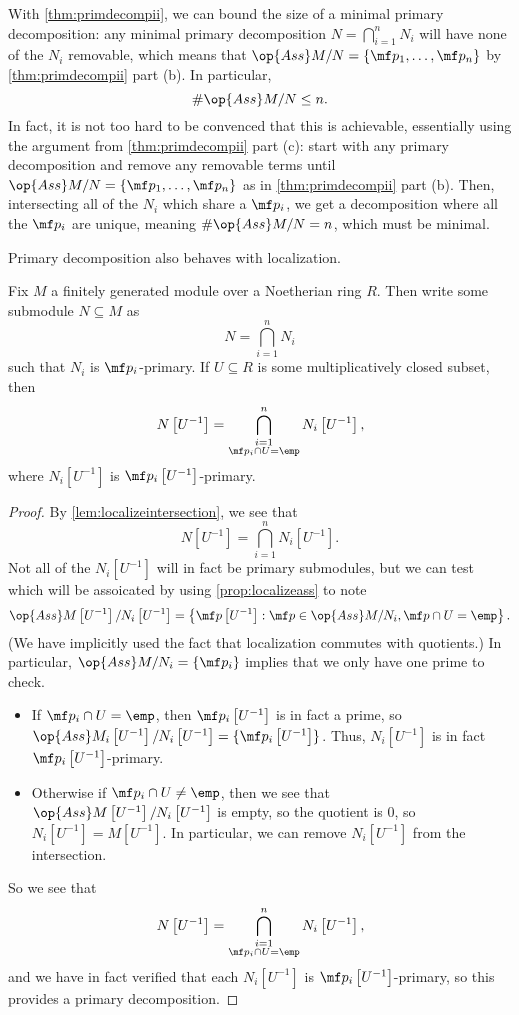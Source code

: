 \begin{remark}[Nir] \label{rem:findminimalprimdecomp}
	With \autoref{thm:primdecompii}, we can bound the size of a minimal primary decomposition: any minimal primary decomposition $N=\bigcap_{i=1}^nN_i$ will have none of the $N_i$ removable, which means that $\op{Ass}M/N=\{\mf p_1,\ldots,\mf p_n\}$ by \autoref{thm:primdecompii} part (b). In particular,
	\[\#\op{Ass}M/N\le n.\]
	In fact, it is not too hard to be convenced that this is achievable, essentially using the argument from \autoref{thm:primdecompii} part (c): start with any primary decomposition and remove any removable terms until $\op{Ass}M/N=\{\mf p_1,\ldots,\mf p_n\}$ as in \autoref{thm:primdecompii} part (b). Then, intersecting all of the $N_i$ which share a $\mf p_i$, we get a decomposition where all the $\mf p_i$ are unique, meaning $\#\op{Ass}M/N=n$, which must be minimal.
\end{remark}
Primary decomposition also behaves with localization.
\begin{theorem}
	Fix $M$ a finitely generated module over a Noetherian ring $R$. Then write some submodule $N\subseteq M$ as
	\[N=\bigcap_{i=1}^nN_i\]
	such that $N_i$ is $\mf p_i$-primary. If $U\subseteq R$ is some multiplicatively closed subset, then
	\[N\left[U^{-1}\right]=\bigcap_{\substack{i=1\\\mf p_i\cap U=\emp}}^nN_i\left[U^{-1}\right],\]
	where $N_i\left[U^{-1}\right]$ is $\mf p_i\left[U^{-1}\right]$-primary.
\end{theorem}
\begin{proof}
	By \autoref{lem:localizeintersection}, we see that
	\[N\left[U^{-1}\right]=\bigcap_{i=1}^nN_i\left[U^{-1}\right].\]
	Not all of the $N_i\left[U^{-1}\right]$ will in fact be primary submodules, but we can test which will be assoicated by using \autoref{prop:localizeass} to note
	\[\op{Ass}M\left[U^{-1}\right]/N_i\left[U^{-1}\right]=\left\{\mf p\left[U^{-1}\right]:\mf p\in\op{Ass}M/N_i,\mf p\cap U=\emp\right\}.\]
	(We have implicitly used the fact that localization commutes with quotients.) In particular, $\op{Ass}M/N_i=\{\mf p_i\}$ implies that we only have one prime to check.
	\begin{itemize}
		\item If $\mf p_i\cap U=\emp$, then $\mf p_i\left[U^{-1}\right]$ is in fact a prime, so $\op{Ass}M_i\left[U^{-1}\right]/N_i\left[U^{-1}\right]=\{\mf p_i\left[U^{-1}\right]\}$. Thus, $N_i\left[U^{-1}\right]$ is in fact $\mf p_i\left[U^{-1}\right]$-primary.
		\item Otherwise if $\mf p_i\cap U\ne\emp$, then we see that $\op{Ass}M\left[U^{-1}\right]/N_i\left[U^{-1}\right]$ is empty, so the quotient is $0$, so $N_i\left[U^{-1}\right]=M\left[U^{-1}\right]$. In particular, we can remove $N_i\left[U^{-1}\right]$ from the intersection.
	\end{itemize}
	So we see that
	\[N\left[U^{-1}\right]=\bigcap_{\substack{i=1\\\mf p_i\cap U=\emp}}^nN_i\left[U^{-1}\right],\]
	and we have in fact verified that each $N_i\left[U^{-1}\right]$ is $\mf p_i\left[U^{-1}\right]$-primary, so this provides a primary decomposition.
\end{proof}

